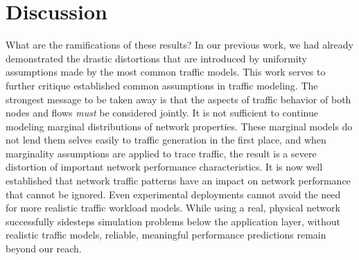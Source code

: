 \documentclass[twocolumn,final]{svjour3}
\newcommand{\caps}[1]{{\small{#1}}}
\begin{document}

\section{Discussion}\label{sec:discussion}


What are the ramifications of these results? In our previous work, we had already demonstrated the drastic distortions that are introduced by uniformity assumptions made by the most common traffic models. This work serves to further critique established common assumptions in traffic modeling. The strongest message to be taken away is that the aspects of traffic behavior of both nodes and flows \textit{must} be considered jointly. It is not sufficient to continue modeling marginal distributions of network properties. These marginal models do not lend them selves easily to traffic generation in the first place, and when marginality assumptions are applied to trace traffic, the result is a severe distortion of important network performance characteristics. It is now well established that network traffic patterns have an impact on network performance that cannot be ignored. Even experimental deployments cannot avoid the need for more realistic traffic workload models. While using a real, physical network successfully sidesteps simulation problems below the application layer, without realistic traffic models, reliable, meaningful performance predictions remain beyond our reach.


\end{document}

